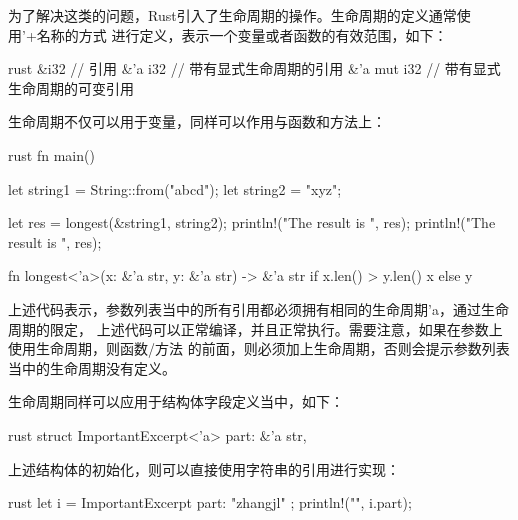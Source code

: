 为了解决这类的问题，Rust引入了生命周期的操作。生命周期的定义通常使用'+名称的方式
进行定义，表示一个变量或者函数的有效范围，如下：
\begin{code-block}{rust}
&i32        // 引用
&'a i32     // 带有显式生命周期的引用
&'a mut i32 // 带有显式生命周期的可变引用
\end{code-block}
生命周期不仅可以用于变量，同样可以作用与函数和方法上：
\begin{code-block}{rust}
fn main() {
    let string1 = String::from("abcd");
    let string2 = "xyz";

    let res = longest(&string1, string2);
    println!("The result is {}", res);
    println!("The result is {}", res);
}

fn longest<'a>(x: &'a str, y: &'a str) -> &'a str {
    if x.len() > y.len() {
        x
    } else {
        y
    }
}
\end{code-block}
上述代码表示，参数列表当中的所有引用都必须拥有相同的生命周期'a，通过生命周期的限定，
上述代码可以正常编译，并且正常执行。需要注意，如果在参数上使用生命周期，则函数/方法
的前面，则必须加上生命周期，否则会提示参数列表当中的生命周期没有定义。

生命周期同样可以应用于结构体字段定义当中，如下：
\begin{code-block}{rust}
struct ImportantExcerpt<'a> {
    part: &'a str,
}
\end{code-block}

上述结构体的初始化，则可以直接使用字符串的引用进行实现：
\begin{code-block}{rust}
let i = ImportantExcerpt { part: "zhangjl" };
println!("{}", i.part);
\end{code-block}

